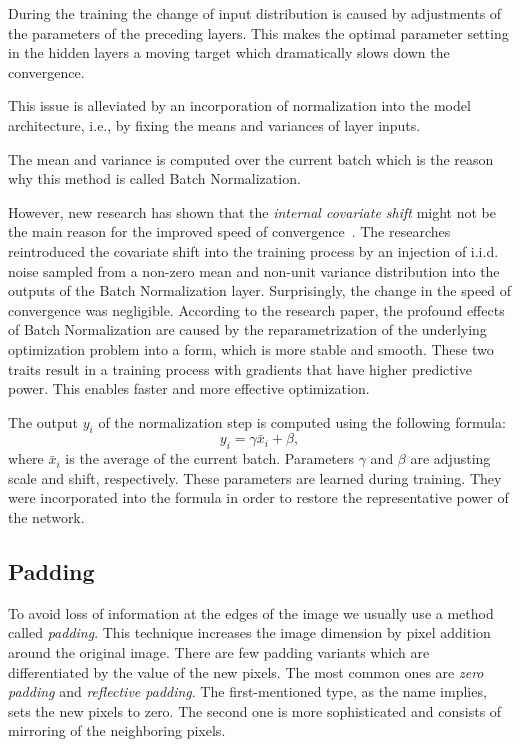 During the training the change of input distribution is caused by adjustments of the parameters of the preceding layers.
This makes the optimal parameter setting in the hidden layers a moving target which dramatically slows down the
convergence.

This issue is alleviated by an incorporation of normalization into the model architecture, i.e., by fixing the means
and variances of layer inputs.

The mean and variance is computed over the current batch which is the reason why this method is called Batch
Normalization.

However, new research has shown that the \textit{internal covariate shift} might not be the main
reason for the improved speed of convergence~\cite{BNormCorrection}.
The researches reintroduced the covariate shift into the training process by an injection of i.i.d. noise sampled
from a non-zero mean and non-unit variance distribution into the outputs of the Batch Normalization layer.
Surprisingly, the change in the speed of convergence was negligible.
According to the research paper, the profound effects of Batch Normalization are caused by the reparametrization
of the underlying optimization problem into a form, which is more stable and smooth.
These two traits result in a training process with gradients that have higher predictive power.
This enables faster and more effective optimization.

The output $y_i$ of the normalization step is computed using the following formula:
\begin{equation}
    y_i = \gamma \bar{x}_i + \beta,
\end{equation}
where $\bar{x}_i$ is the average of the current batch.
Parameters $\gamma$ and $\beta$ are adjusting scale and shift, respectively.
These parameters are learned during training.
They were incorporated into the formula in order to restore the representative power of the network.

\subsection{Padding}\label{subsec:padding}
To avoid loss of information at the edges of the image we usually use a method called \textit{padding}.
This technique increases the image dimension by pixel addition around the original image.
There are few padding variants which are differentiated by the value of the new pixels.
The most common ones are \textit{zero padding} and \textit{reflective padding}.
The first-mentioned type, as the name implies, sets the new pixels to zero.
The second one is more sophisticated and consists of mirroring of the neighboring pixels.

